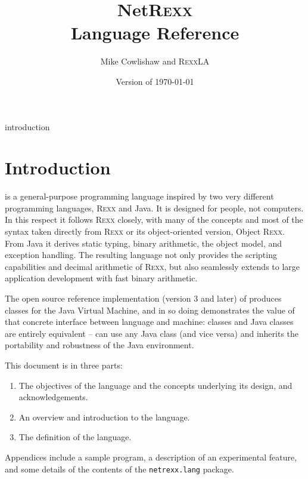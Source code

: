 
 
\renewcommand{\isbn}{978-90-819090-1-3}
\setcounter{tocdepth}{1} 
\title{NetR\textsc{exx}\protect\\Language Reference}
\author{Mike Cowlishaw and R\textsc{exx}LA}
\date{Version \nrversion{} of \today}
\maketitle
{}
\pagestyle{plain}
\frontmatter
{}
\pagestyle{plain}

\tableofcontents
\listoftables
\newpage
{}
\frontmatter
\large


 {introduction}
\mainmatter
\chapter{Introduction}
\nr{} is a general-purpose programming language inspired by two very
different programming languages, R\textsc{exx}\textsuperscript{\texttrademark} and Java\textsuperscript{\texttrademark}. It is designed for
people, not computers. In this respect it follows R\textsc{exx} closely, with
many of the concepts and most of the syntax taken directly from R\textsc{exx}
or its object-oriented version, Object R\textsc{exx}. From Java it derives
static typing, binary arithmetic, the object model, and exception
handling. The resulting language not only provides the scripting
capabilities and decimal arithmetic of R\textsc{exx}, but also seamlessly
extends to large application development with fast binary arithmetic.

The open source reference implementation (version 3 and later) of
\nr{} produces classes for the Java Virtual Machine, and in so doing
demonstrates the value of that concrete interface between language and
machine: \nr{} classes and Java classes are entirely equivalent –
\nr{} can use any Java class (and vice versa) and inherits the
portability and robustness of the Java environment.

This document is in three parts:
\begin{enumerate}
\item The objectives of the \nr{} language and the concepts underlying its design, and acknowledgements.
\item An overview and introduction to the \nr{} language.
\item The definition of the language.
\end{enumerate}
Appendices include a sample \nr{} program, a description of an experimental feature, and some
details of the contents of the \texttt{netrexx.lang} package.
